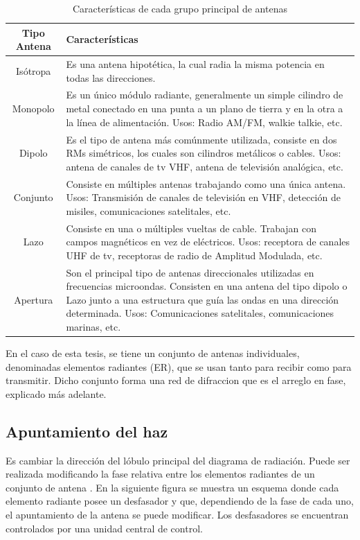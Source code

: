 \begin{table}[H]
  \footnotesize
  \centering
  \begin{tabular}{|c|p{9cm}|}
	\hline
	\textbf{Tipo Antena} & \textbf{Características} \\\hline
	Isótropa & Es una antena hipotética, la cual radia la misma potencia en todas las direcciones.\\\hline
	Monopolo & Es un único módulo radiante, generalmente un simple cilindro de metal conectado en una punta a un plano de
	tierra y en la otra a la línea de alimentación. Usos: Radio AM/FM, walkie talkie, etc. \\\hline
	Dipolo & Es el tipo de antena más comúnmente utilizada, consiste en dos RMs simétricos, los cuales son cilindros
	metálicos o cables. Usos: antena de canales de tv VHF, antena de televisión analógica, etc. \\\hline
	Conjunto & Consiste en múltiples antenas trabajando como una única antena. Usos: Transmisión de canales de televisión en VHF,
	detección de misiles, comunicaciones satelitales, etc.\\\hline
	Lazo & Consiste en una o múltiples vueltas de cable. Trabajan con campos magnéticos en vez de eléctricos. Usos: receptora
	de canales UHF de tv, receptoras de radio de Amplitud Modulada, etc.\\\hline
	Apertura & Son el principal tipo de antenas direccionales utilizadas en frecuencias microondas. Consisten en una antena
	del tipo dipolo o Lazo junto a una estructura que guía las ondas en una dirección determinada. Usos: Comunicaciones
	satelitales, comunicaciones marinas, etc.\\\hline
  \end{tabular}
  \caption{Características de cada grupo principal de antenas}
  \label{tab:type_antennas}
\end{table}


En el caso de esta tesis, se tiene un conjunto de antenas individuales, denominadas elementos radiantes (ER), que se usan tanto
para recibir como para transmitir. Dicho conjunto forma una red de difraccion que es el arreglo en fase, explicado más adelante.


\subsection{Apuntamiento del haz} 

Es cambiar la dirección del lóbulo principal del diagrama de radiación. Puede ser realizada modificando la fase relativa entre
los elementos radiantes de un conjunto de antena \cite{Standard1996}. En la siguiente figura se muestra un esquema donde cada 
elemento radiante posee un desfasador y que, dependiendo de la fase de cada uno, el apuntamiento de la antena se puede modificar.
Los desfasadores se encuentran controlados por una unidad central de control.

